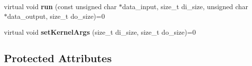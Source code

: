\begin{DoxyCompactItemize}
\item 
\hypertarget{class_open_c_l_algorithm_a8b509fcddcd2e4573faa5a6577cbf440}{virtual void {\bfseries run} (const unsigned char $\ast$data\-\_\-input, size\-\_\-t di\-\_\-size, unsigned char $\ast$data\-\_\-output, size\-\_\-t do\-\_\-size)=0}\label{class_open_c_l_algorithm_a8b509fcddcd2e4573faa5a6577cbf440}

\item 
\hypertarget{class_open_c_l_algorithm_aaacc618bcb4834c93bdd9f625963c8d4}{virtual void {\bfseries set\-Kernel\-Args} (size\-\_\-t di\-\_\-size, size\-\_\-t do\-\_\-size)=0}\label{class_open_c_l_algorithm_aaacc618bcb4834c93bdd9f625963c8d4}

\end{DoxyCompactItemize}
\subsection*{Protected Attributes}
